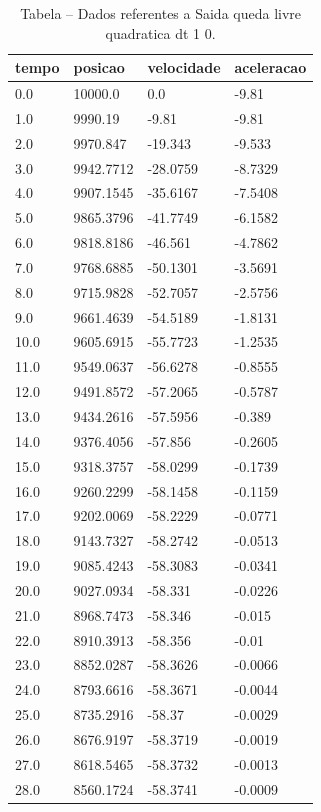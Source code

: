 \begin{table}[H]
\centering
\caption{Tabela – Dados referentes a Saida queda livre quadratica dt 1 0.}
\label{tab:saida_queda_livre_quadratica_dt_1_0}
\begin{tabular}{llll}
\toprule
tempo & posicao & velocidade & aceleracao \\
\midrule
0.0 & 10000.0 & 0.0 & -9.81 \\
1.0 & 9990.19 & -9.81 & -9.81 \\
2.0 & 9970.847 & -19.343 & -9.533 \\
3.0 & 9942.7712 & -28.0759 & -8.7329 \\
4.0 & 9907.1545 & -35.6167 & -7.5408 \\
5.0 & 9865.3796 & -41.7749 & -6.1582 \\
6.0 & 9818.8186 & -46.561 & -4.7862 \\
7.0 & 9768.6885 & -50.1301 & -3.5691 \\
8.0 & 9715.9828 & -52.7057 & -2.5756 \\
9.0 & 9661.4639 & -54.5189 & -1.8131 \\
10.0 & 9605.6915 & -55.7723 & -1.2535 \\
11.0 & 9549.0637 & -56.6278 & -0.8555 \\
12.0 & 9491.8572 & -57.2065 & -0.5787 \\
13.0 & 9434.2616 & -57.5956 & -0.389 \\
14.0 & 9376.4056 & -57.856 & -0.2605 \\
15.0 & 9318.3757 & -58.0299 & -0.1739 \\
16.0 & 9260.2299 & -58.1458 & -0.1159 \\
17.0 & 9202.0069 & -58.2229 & -0.0771 \\
18.0 & 9143.7327 & -58.2742 & -0.0513 \\
19.0 & 9085.4243 & -58.3083 & -0.0341 \\
20.0 & 9027.0934 & -58.331 & -0.0226 \\
21.0 & 8968.7473 & -58.346 & -0.015 \\
22.0 & 8910.3913 & -58.356 & -0.01 \\
23.0 & 8852.0287 & -58.3626 & -0.0066 \\
24.0 & 8793.6616 & -58.3671 & -0.0044 \\
25.0 & 8735.2916 & -58.37 & -0.0029 \\
26.0 & 8676.9197 & -58.3719 & -0.0019 \\
27.0 & 8618.5465 & -58.3732 & -0.0013 \\
28.0 & 8560.1724 & -58.3741 & -0.0009 \\

\end{tabular}
\end{table}
